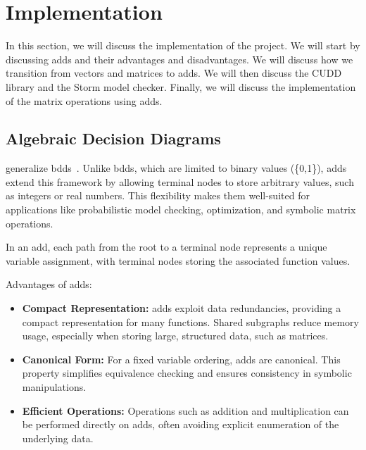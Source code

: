 \section{Implementation}\label{sec:implementation}
In this section, we will discuss the implementation of the project.
We will start by discussing \glspl{add} and their advantages and disadvantages.
We will discuss how we transition from vectors and matrices to \glspl{add}.
We will then discuss the CUDD library and the Storm model checker.
Finally, we will discuss the implementation of the matrix operations using \glspl{add}.


\subsection{Algebraic Decision Diagrams}\label{subsec:algebraic-decision-diagrams}
 generalize \glspl{bdd}~\cite{bahar1997algebric}.
Unlike \glspl{bdd}, which are limited to binary values (\{0,1\}), \glspl{add} extend this framework by allowing terminal nodes to store arbitrary values, such as integers or real numbers. 
This flexibility makes them well-suited for applications like probabilistic model checking, optimization, and symbolic matrix operations.

In an \gls{add}, each path from the root to a terminal node represents a unique variable assignment, with terminal nodes storing the associated function values.

Advantages of \glspl{add}:
\begin{itemize}
\item \textbf{Compact Representation:} \glspl{add} exploit data redundancies, providing a compact representation for many functions. Shared subgraphs reduce memory usage, especially when storing large, structured data, such as matrices.
\item \textbf{Canonical Form:} For a fixed variable ordering, \glspl{add} are canonical. This property simplifies equivalence checking and ensures consistency in symbolic manipulations.
\item \textbf{Efficient Operations:} Operations such as addition and multiplication can be performed directly on \glspl{add}, often avoiding explicit enumeration of the underlying data.
\end{itemize}


